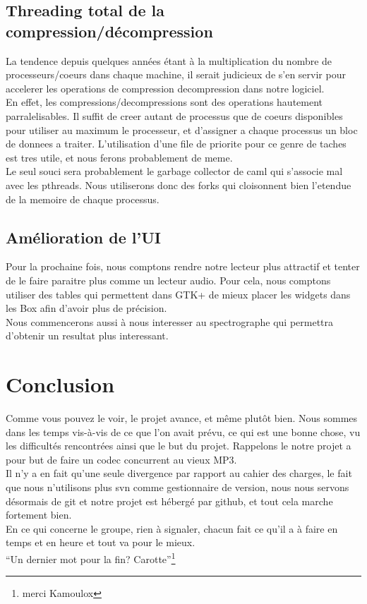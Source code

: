 \documentclass[a4paper,12pt]{article}
\begin{document}
	\subsection{Threading total de la compression/décompression}
La tendence depuis quelques ann\'ees \'etant \`a la multiplication du nombre de processeurs/coeurs dans chaque machine, il serait judicieux de s'en servir pour accelerer les operations de compression decompression dans notre logiciel.\\
En effet, les compressions/decompressions sont des operations hautement parralelisables. Il suffit de creer autant de processus que de coeurs disponibles pour utiliser au maximum le processeur, et d'assigner a chaque processus un bloc de donnees a traiter. L'utilisation d'une file de priorite pour ce genre de taches est tres utile, et nous ferons probablement de meme.\\
Le seul souci sera probablement le garbage collector de caml qui s'associe mal avec les pthreads. Nous utiliserons donc des forks qui cloisonnent bien l'etendue de la memoire de chaque processus.

	\subsection{Amélioration de l'UI}
Pour la prochaine fois, nous comptons
rendre notre lecteur plus attractif et tenter de le faire paraitre plus comme un
lecteur audio. Pour cela, nous comptons utiliser des tables qui permettent dans
GTK+ de mieux placer les widgets dans les Box afin d'avoir plus de précision. \\
Nous commencerons aussi \`a nous interesser au spectrographe qui permettra d'obtenir un resultat plus interessant.


\newpage

\section*{Conclusion}
Comme vous pouvez le voir, le projet avance, et même plutôt bien. Nous sommes
dans les temps vis-à-vis de ce que l'on avait prévu, ce qui est une bonne chose,
vu les difficultés rencontrées ainsi que le but du projet. Rappelons le notre
projet a pour but de faire un codec concurrent au vieux MP3.\\
Il n'y a en fait qu'une seule divergence par rapport au cahier des charges, le
fait que nous n'utilisons plus svn comme gestionnaire de version, nous nous
servons désormais de git et notre projet est hébergé par github, et tout cela
marche fortement bien.\\
En ce qui concerne le groupe, rien à signaler, chacun fait ce qu'il a à faire en
temps et en heure et tout va pour le mieux.\\
``Un dernier mot pour la fin? Carotte''\footnote{merci Kamoulox}\\
\end{document}
